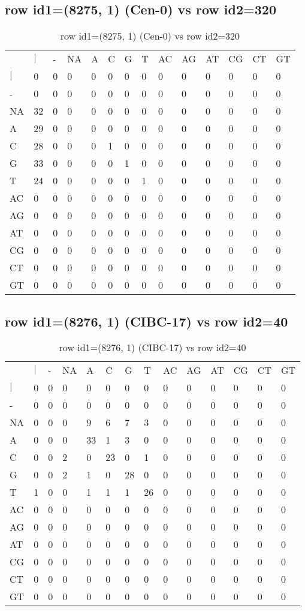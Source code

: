 \subsection{row id1=(8275, 1) (Cen-0) vs row id2=320}
\begin{center}
\begin{longtable}{|l|l|l|l|l|l|l|l|l|l|l|l|l|l|}
\caption{row id1=(8275, 1) (Cen-0) vs row id2=320} \label{table_dm432}\\
\hline
\\
\hline
&$|$&-&NA&A&C&G&T&AC&AG&AT&CG&CT&GT\\
$|$&0&0&0&0&0&0&0&0&0&0&0&0&0\\
-&0&0&0&0&0&0&0&0&0&0&0&0&0\\
NA&32&0&0&0&0&0&0&0&0&0&0&0&0\\
A&29&0&0&0&0&0&0&0&0&0&0&0&0\\
C&28&0&0&0&1&0&0&0&0&0&0&0&0\\
G&33&0&0&0&0&1&0&0&0&0&0&0&0\\
T&24&0&0&0&0&0&1&0&0&0&0&0&0\\
AC&0&0&0&0&0&0&0&0&0&0&0&0&0\\
AG&0&0&0&0&0&0&0&0&0&0&0&0&0\\
AT&0&0&0&0&0&0&0&0&0&0&0&0&0\\
CG&0&0&0&0&0&0&0&0&0&0&0&0&0\\
CT&0&0&0&0&0&0&0&0&0&0&0&0&0\\
GT&0&0&0&0&0&0&0&0&0&0&0&0&0\\
\hline
\end{longtable}
\end{center}

\subsection{row id1=(8276, 1) (CIBC-17) vs row id2=40}
\begin{center}
\begin{longtable}{|l|l|l|l|l|l|l|l|l|l|l|l|l|l|}
\caption{row id1=(8276, 1) (CIBC-17) vs row id2=40} \label{table_dm434}\\
\hline
\\
\hline
&$|$&-&NA&A&C&G&T&AC&AG&AT&CG&CT&GT\\
$|$&0&0&0&0&0&0&0&0&0&0&0&0&0\\
-&0&0&0&0&0&0&0&0&0&0&0&0&0\\
NA&0&0&0&9&6&7&3&0&0&0&0&0&0\\
A&0&0&0&33&1&3&0&0&0&0&0&0&0\\
C&0&0&2&0&23&0&1&0&0&0&0&0&0\\
G&0&0&2&1&0&28&0&0&0&0&0&0&0\\
T&1&0&0&1&1&1&26&0&0&0&0&0&0\\
AC&0&0&0&0&0&0&0&0&0&0&0&0&0\\
AG&0&0&0&0&0&0&0&0&0&0&0&0&0\\
AT&0&0&0&0&0&0&0&0&0&0&0&0&0\\
CG&0&0&0&0&0&0&0&0&0&0&0&0&0\\
CT&0&0&0&0&0&0&0&0&0&0&0&0&0\\
GT&0&0&0&0&0&0&0&0&0&0&0&0&0\\
\hline
\end{longtable}
\end{center}

